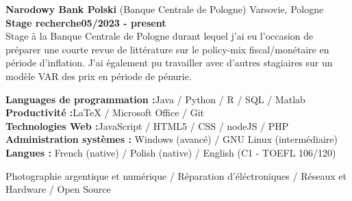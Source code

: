 \documentclass[11pt]{report}
\begin{document}
\noindent\textbf{Narodowy Bank Polski} (Banque Centrale de Pologne) \hfill Varsovie, Pologne \\[0.1cm]
\textbf{Stage recherche}\hfill \textbf{05/2023 - present} \\
Stage à la Banque Centrale de Pologne durant lequel j'ai eu l'occasion de préparer une courte revue de littérature sur le policy-mix fiscal/monétaire en période d'inflation. J'ai également pu travailler avec d'autres stagiaires sur un modèle VAR des prix en période de pénurie. 

	\begin{flushleft}
	 \hrulefill
	\end{flushleft}



  \noindent\textbf{Languages de programmation :}\hfill{Java / Python / R / SQL / Matlab} \\
  \textbf{Productivité :}\hfill LaTeX / Microsoft Office / Git\\
  \textbf{Technologies Web :}\hfill JavaScript / HTML5 / CSS / nodeJS / PHP  \\
  \textbf{Administration systèmes :} \hfill Windows (avancé) / GNU Linux (intermédiaire)\\
  \textbf{Langues :} \hfill French (native) / Polish (native) / English (C1 - TOEFL 106/120) 

	\begin{flushleft}
	 \hrulefill
	\end{flushleft}

\noindent Photographie argentique et numérique / Réparation d'éléctroniques / Réseaux et Hardware / Open Source
\end{document}
